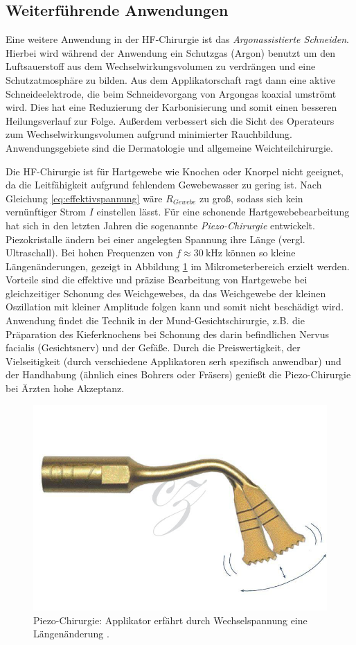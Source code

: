 \documentclass[letterpaper,12pt]{article}
\begin{document}
			
		\subsection{Weiterführende Anwendungen}
			
			Eine weitere Anwendung in der HF-Chirurgie ist das \emph{Argonassistierte Schneiden}. Hierbei wird während der Anwendung ein Schutzgas (Argon) benutzt um den Luftsauerstoff aus dem Wechselwirkungsvolumen zu verdrängen und eine Schutzatmosphäre zu bilden. Aus dem Applikatorschaft ragt dann eine aktive Schneideelektrode, die beim Schneidevorgang von Argongas koaxial umströmt wird. Dies hat eine Reduzierung der Karbonisierung und somit einen besseren Heilungsverlauf zur Folge. Außerdem verbessert sich die Sicht des Operateurs zum Wechselwirkungsvolumen aufgrund minimierter Rauchbildung. Anwendungsgebiete sind die Dermatologie und allgemeine Weichteilchirurgie.
					
			Die HF-Chirurgie ist für Hartgewebe wie Knochen oder Knorpel nicht geeignet, da die Leitfähigkeit aufgrund fehlendem Gewebewasser zu gering ist. Nach Gleichung \ref{eq:effektivspannung} wäre $R_{Gewebe}$ zu groß, sodass sich kein vernünftiger Strom $I$ einstellen lässt. Für eine schonende Hartgewebebearbeitung hat sich in den letzten Jahren die sogenannte \emph{Piezo-Chirurgie} entwickelt. Piezokristalle ändern bei einer angelegten Spannung ihre Länge (vergl. Ultraschall). Bei hohen Frequenzen von  $f\approx\SI{30}{\kilo\hertz}$ können so kleine Längenänderungen, gezeigt in Abbildung \ref{fig:piezoChirurgie} im Mikrometerbereich erzielt werden. Vorteile sind die effektive und präzise Bearbeitung von Hartgewebe bei gleichzeitiger Schonung des Weichgewebes, da das Weichgewebe der kleinen Oszillation mit kleiner Amplitude folgen kann und somit nicht beschädigt wird. Anwendung findet die Technik in der Mund-Gesichtschirurgie, z.B. die Präparation des Kieferknochens bei Schonung des darin befindlichen Nervus facialis (Gesichtsnerv) und der Gefäße. Durch die Preiswertigkeit, der Vielseitigkeit (durch verschiedene Applikatoren serh spezifisch anwendbar) und der Handhabung (ähnlich eines Bohrers oder Fräsers) genießt die Piezo-Chirurgie bei Ärzten hohe Akzeptanz.
			\begin{figure}[ht] 
				\centering
				\includegraphics[width=0.3\columnwidth]{images/piezoChirurgie.png}
				\caption{		 
					Piezo-Chirurgie: Applikator erfährt durch Wechselspannung eine Längenänderung \cite{piezoChirurgie}.}
				\label{fig:piezoChirurgie}
			\end{figure}
	
\end{document}
